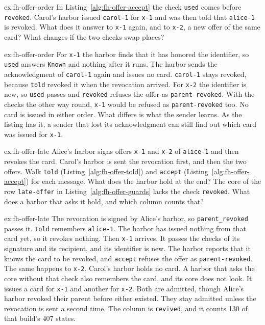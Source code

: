 \documentclass[11pt,a4paper]{article}
\theoremstyle{definition}
\theoremstyle{remark}
\begin{document}
\begin{pdexercise}[kind=Trace,rating=2]{ex:fh-offer-order}
In Listing~\ref{alg:fh-offer-accept} the check \texttt{used} comes before
\texttt{revoked}. Carol's harbor issued \texttt{carol-1} for \texttt{x-1}
and was then told that \texttt{alice-1} is revoked. What does it answer
to \texttt{x-1} again, and to \texttt{x-2}, a new offer of the same card?
What changes if the two checks swap places?
\end{pdexercise}
\begin{pdsolution}{ex:fh-offer-order}
For \texttt{x-1} the harbor finds that it has honored the identifier, so
\texttt{used} answers \texttt{Known} and nothing after it runs. The
harbor sends the acknowledgment of \texttt{carol-1} again and issues no
card. \texttt{carol-1} stays revoked, because \texttt{told} revoked it
when the revocation arrived. For \texttt{x-2} the identifier is new, so
\texttt{used} passes and \texttt{revoked} refuses the offer as
\texttt{parent-revoked}. With the checks the other way round,
\texttt{x-1} would be refused as \texttt{parent-revoked} too. No card is
issued in either order. What differs is what the sender learns. As the
listing has it, a sender that lost its acknowledgment can still find out
which card was issued for \texttt{x-1}.
\end{pdsolution}

\begin{pdexercise}[kind=Trace,rating=2]{ex:fh-offer-late}
Alice's harbor signs offers \texttt{x-1} and \texttt{x-2} of
\texttt{alice-1} and then revokes the card. Carol's harbor is sent the
revocation first, and then the two offers. Walk \texttt{told}
(Listing~\ref{alg:fh-offer-told}) and \texttt{accept}
(Listing~\ref{alg:fh-offer-accept}) for each message. What does the
harbor hold at the end? The core of the row \texttt{late-offer} in
Listing~\ref{alg:fh-offer-guards} lacks the check \texttt{revoked}. What
does a harbor that asks it hold, and which column counts that?
\end{pdexercise}
\begin{pdsolution}{ex:fh-offer-late}
The revocation is signed by Alice's harbor, so \texttt{parent\_revoked}
passes it. \texttt{told} remembers \texttt{alice-1}. The harbor has
issued nothing from that card yet, so it revokes nothing. Then
\texttt{x-1} arrives. It passes the checks of its signature and its
recipient, and its identifier is new. The harbor reports that it knows
the card to be
revoked, and \texttt{accept} refuses the offer as
\texttt{parent-revoked}. The same happens to \texttt{x-2}. Carol's harbor
holds no card. A harbor that asks the core without that check also
remembers the card, and its core does not look. It issues a card for
\texttt{x-1} and another for \texttt{x-2}. Both are admitted, though
Alice's harbor revoked their parent before either existed. They stay
admitted unless the revocation is sent a second time. The column is
\texttt{revived}, and it counts 130 of that build's 407 states.
\end{pdsolution}
\end{document}
